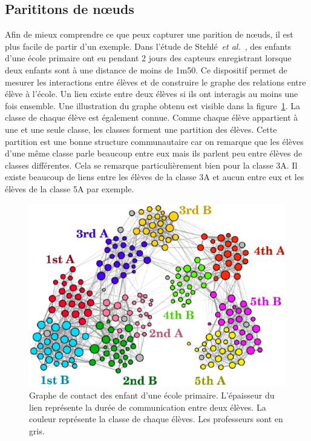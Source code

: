 \subsection{Parititons de n\oe uds}
\label{subsec:Part_noeuds}
Afin de mieux comprendre ce que peux capturer une parition de n\oe uds, il est plus facile de partir d'un exemple.
Dans l'étude de Stehlé~\emph{et al.}~\cite{Stehle2011}, des enfants d'une école primaire ont eu pendant 2 jours des capteurs enregistrant lorsque deux enfants sont à une distance de moins de 1m50.
Ce dispositif permet de mesurer les interactions entre élèves et de construire le graphe des relations entre élève à l'école.
Un lien existe entre deux élèves si ils ont interagis au moins une fois ensemble.
Une illustration du graphe obtenu est visible dans la figure~\ref{fig:ecole_primaire}.
La classe de chaque élève est également connue.
Comme chaque élève appartient à une et une seule classe, les classes forment une partition des élèves.
Cette partition est une bonne structure communautaire car on remarque que les élèves d'une même classe parle beaucoup entre eux mais ils parlent peu entre élèves de classes différentes.
Cela se remarque particulièrement bien pour la classe 3A.
Il existe beaucoup de liens entre les élèves de la classe 3A et aucun entre eux et les élèves de la classe 5A par exemple.

\begin{figure}
\centering
\includegraphics[width=0.7\linewidth]{img/Intro/ecole_primaire}
\caption{Graphe de contact des enfant d'une école primaire. L'épaisseur du lien représente la durée de communication entre deux élèves. La couleur représente la classe de chaque élèves. Les professeurs sont en gris.\protect\footnotemark}
\label{fig:ecole_primaire}
\end{figure}


